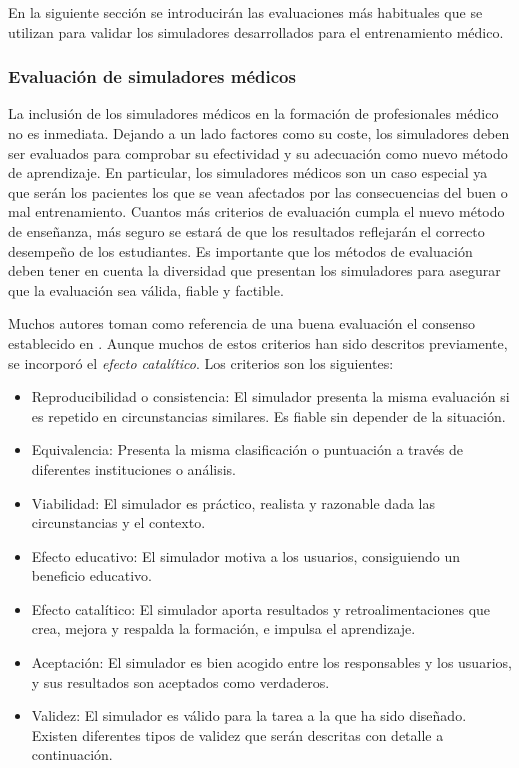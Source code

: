 
En la siguiente sección se introducirán las evaluaciones más habituales que se utilizan para validar los simuladores desarrollados para el entrenamiento médico.



\subsubsection{Evaluación de simuladores médicos}
\label{art:evaluation}

La inclusión de los simuladores médicos en la formación de profesionales médico no es inmediata. Dejando a un lado factores como su coste, los simuladores deben ser evaluados para comprobar su efectividad y su adecuación como nuevo método de aprendizaje. En particular, los simuladores médicos son un caso especial ya que serán los pacientes los que se vean afectados por las consecuencias del buen o mal entrenamiento. Cuantos más criterios de evaluación cumpla el nuevo método de enseñanza, más seguro se estará de que los resultados reflejarán el correcto desempeño de los estudiantes.
Es importante que los métodos de evaluación deben tener en cuenta la diversidad que presentan los simuladores para asegurar que la evaluación sea válida, fiable y factible. 

Muchos autores toman como referencia de una buena evaluación el consenso establecido en  \cite{norcini2011criteria}. Aunque muchos de estos criterios han sido descritos previamente, se incorporó el  \emph{efecto catalítico}. Los criterios son los siguientes:

\begin{itemize}

\item Reproducibilidad o consistencia: El simulador presenta la misma evaluación si es repetido en circunstancias similares. Es fiable sin depender de la situación.
\item Equivalencia: Presenta la misma clasificación o puntuación a través de diferentes instituciones o análisis.
\item Viabilidad: El simulador es práctico, realista y razonable dada las circunstancias y el contexto.
\item Efecto educativo: El simulador motiva a los usuarios, consiguiendo un beneficio educativo.
\item Efecto catalítico: El simulador aporta resultados y retroalimentaciones que crea, mejora y respalda la formación, e impulsa el aprendizaje.
\item Aceptación: El simulador es bien acogido entre los responsables y los usuarios, y sus resultados son aceptados como verdaderos.

\item Validez: El simulador es válido para la tarea a la que ha sido diseñado. Existen diferentes tipos de validez que serán descritas con detalle a continuación.

\end{itemize}





